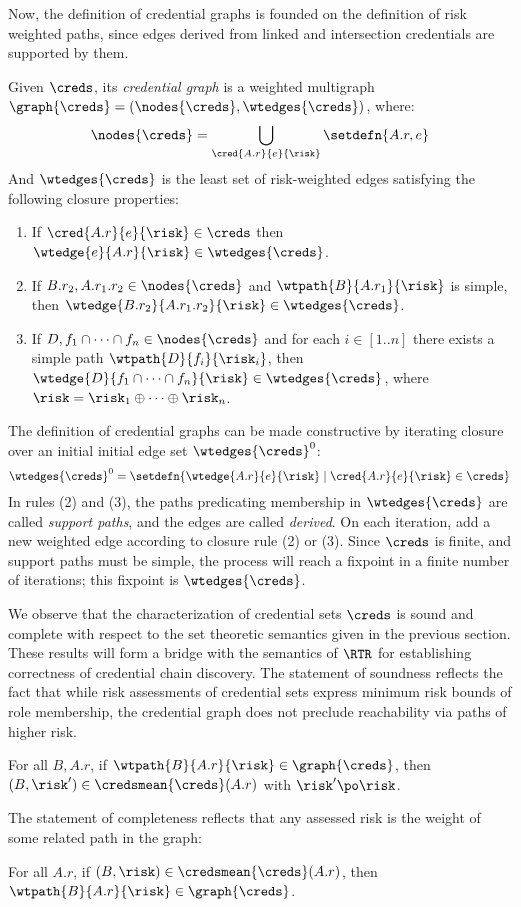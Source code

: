 Now, the definition of credential graphs is founded on the definition of risk weighted paths,
since edges derived from linked and intersection credentials are supported by them.
\begin{definition}
  \label{def-credentialgraph}
  Given $\creds$, its \emph{credential graph} is a weighted multigraph $\graph{\creds} =
  (\nodes{\creds}, \wtedges{\creds})$, where:
$$
\nodes{\creds} = \bigcup\limits_{\cred{A.r}{e}{\risk}} \setdefn{A.r,e}
$$
And $\wtedges{\creds}$ is the least set of risk-weighted edges satisfying the following closure
properties:
\begin{enumerate}
\item If $\cred{A.r}{e}{\risk} \in \creds$ then $\wtedge{e}{A.r}{\risk} \in \wtedges{\creds}$.
\item If $B.r_2, A.r_1.r_2 \in \nodes{\creds}$ and $\wtpath{B}{A.r_1}{\risk}$ is simple, then
  $\wtedge{B.r_2}{A.r_1.r_2}{\risk} \in \wtedges{\creds}$.
\item If $D,f_1\cap \cdots \cap f_n \in \nodes{\creds}$ and for each $i \in [1..n]$ there exists
  a simple path $\wtpath{D}{f_i}{\risk_i}$, then $\wtedge{D}{f_1 \cap \cdots \cap f_n}{\risk}
  \in \wtedges{\creds}$, where $\risk = \risk_1 \oplus \cdots \oplus \risk_n$.
\end{enumerate}
\end{definition}

The definition of credential graphs can be made constructive by iterating closure over an
initial initial edge set $\wtedges{\creds}^0$:
$$
\wtedges{\creds}^0 = \setdefn{\wtedge{A.r}{e}{\risk} \mid 
\cred{A.r}{e}{\risk} \in \creds}
$$ 
In rules (2) and (3), the paths predicating membership in $\wtedges{\creds}$ are called
\emph{support paths}, and the edges are called \emph{derived}. On each iteration, add a new
weighted edge according to closure rule (2) or (3). Since $\creds$ is finite, and support paths
must be simple, the process will reach a fixpoint in a finite number of iterations; this
fixpoint is $\wtedges{\creds}$.

We observe that the characterization of credential sets $\creds$ is sound and complete with
respect to the set theoretic semantics given in the previous section. These results will form a
bridge with the semantics of $\RTR$ for establishing correctness of credential chain discovery.
The statement of soundness reflects the fact that while risk assessments of credential sets
express minimum risk bounds of role membership, the credential graph does not preclude
reachability via paths of higher risk.
\begin{theorem}[Soundness]
  For all $B,A.r$, if $\wtpath{B}{A.r}{\risk} \in \graph{\creds}$, then $(B,\risk') \in
  \credsmean{\creds}(A.r)$ with $\risk' \po \risk$.
\end{theorem}
The statement of completeness reflects that any assessed risk is the weight of some related path
in the graph:
\begin{theorem}[Completeness]
  For all $A.r$, if $(B,\risk) \in \credsmean{\creds}(A.r)$, then $\wtpath{B}{A.r}{\risk} \in
  \graph{\creds}$.
\end{theorem}


